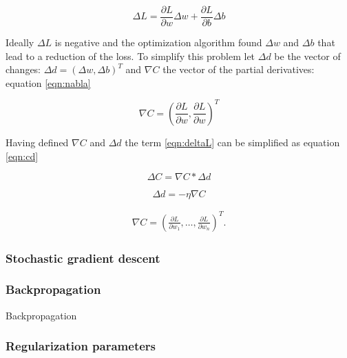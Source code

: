 \begin{equation}
  \Delta L = \frac{\partial L}{\partial w} \Delta w + \frac{\partial L}{\partial b} \Delta b
\label{eqn:deltaL}   
\end{equation}

Ideally $\Delta L$ is negative and the optimization algorithm found $\Delta w$ and $\Delta b$ that lead to a reduction of the loss. To simplify this problem let $\Delta d$ be the vector of changes: $\Delta d = (\Delta w ,  \Delta b)^T $ and $\nabla C$ the vector of the partial derivatives: equation \ref{eqn:nabla}

\begin{equation}
 \nabla C = \left(\frac{\partial L}{\partial w}, \frac{\partial L}{\partial w}\right)^T
\label{eqn:nabla}
\end{equation}

Having defined $\nabla C$ and $\Delta d$ the term \ref{eqn:deltaL} can be simplified as equation \ref{eqn:cd}

\begin{equation}
\Delta C = \nabla C * \Delta d
  \label{eqn:cd}
\end{equation}

\begin{equation}
  \Delta d = -\eta \nabla C
  \label{eqn:eta}
\end{equation}


\begin{eqnarray}
  \nabla C = \left(\frac{\partial L}{\partial w_1}, \ldots,
  \frac{\partial L}{\partial w_n}\right)^T.
  \label{eqn:gd}
\end{eqnarray}


\subsubsection{Stochastic gradient descent}

\subsubsection{Backpropagation}

Backpropagation \cite{rumelhart1988learning}

\subsubsection{Regularization parameters}







